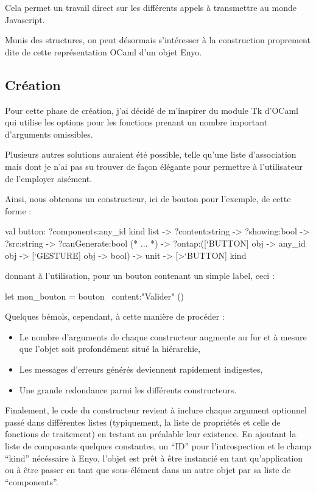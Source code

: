 \documentclass[11pt,a4paper]{report}
\begin{document}
Cela permet un travail direct sur les différents appels à transmettre au monde Javascript.

Munis des structures, on peut désormais s'intéresser à la construction proprement dite de cette
représentation OCaml d'un objet Enyo.

\subsection{Création}

Pour cette phase de création, j'ai décidé de m'inspirer du module Tk d'OCaml qui utilise les options
pour les fonctions prenant un nombre important d'arguments omissibles.

Plusieurs autres solutions auraient été possible, telle qu'une liste d'association mais dont
je n'ai pas su trouver de façon élégante pour permettre à l'utilisateur de l'employer aisément.

Ainsi, nous obtenons un constructeur, ici de bouton pour l'exemple, de cette forme :

\begin{OCaml}
  val button:
    ?components:any_id kind list
    -> ?content:string
    -> ?showing:bool
    -> ?src:string
    -> ?canGenerate:bool
    (* ... *)
    -> ?ontap:([`BUTTON] obj -> 
               any_id obj -> 
               [`GESTURE] obj -> bool)
    -> unit -> [>`BUTTON] kind
\end{OCaml}

donnant à l'utilisation, pour un bouton contenant un simple label, ceci :

\label{bouton_kind_ex}
\begin{OCaml}
  let mon_bouton = bouton ~content:"Valider" ()
\end{OCaml}

Quelques bémols, cependant, à cette manière de procéder :
\begin{itemize}
\item Le nombre d'arguments de chaque constructeur augmente au fur et à mesure que l'objet
soit profondément situé la hiérarchie,
\item Les messages d'erreurs générés deviennent rapidement indigestes,
\item Une grande redondance parmi les différents constructeurs.
\end{itemize}

Finalement, le code du constructeur revient à inclure chaque argument optionnel passé dans différentes 
listes (typiquement, la liste de propriétés et celle de fonctions de traitement) en testant
au préalable leur existence.
En ajoutant la liste de composants quelques constantes, un ``ID'' pour l'introspection et 
le champ ``kind'' nécéssaire à Enyo, l'objet est prêt à être instancié en tant qu'application 
ou à être passer en tant que sous-élément dans un autre objet par sa liste de ``components''.
\end{document}
